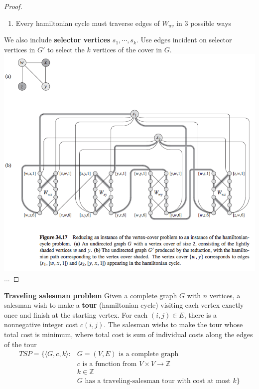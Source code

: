 \documentclass[11pt]{article}
\begin{document}
\begin{theorem*}
\begin{enumerate}
\begin{proof}
\begin{enumerate}
                \item Every hamiltonian cycle must traverse edges of $W_{uv}$ in 3 possible ways
            \end{enumerate}
            We also include \textbf{selector vertices} $s_1,\cdots, s_k$. Use edges incident on selector vertices in $G'$ to select the $k$ vertices of the cover in $G$. \\ 
            \includegraphics[width=\textwidth]{hamcycle_npc2.png}
            ...
        \end{proof}
    \end{enumerate}
\end{theorem*}


\begin{defn*}
    \textbf{Traveling salesman problem} Given a complete graph $G$ with $n$ vertices, a salesman wish to make a \textbf{tour} (hamiltonian cycle) visiting each vertex exactly once and finish at the starting vertex. For each $(i,j)\in E$, there is a nonnegative integer cost $c(i,j)$. The salesman wishs to make the tour whose total cost is minimum, where total cost is sum of individual costs along the edges of the tour 
    \begin{align*}
        TSP = \{\langle G, c, k \rangle : &G = (V,E) \text{ is a complete graph } \\
                    & \text{$c$ is a function from } V \times V \to \mathbb{Z}\\ 
                    & k\in \mathbb{Z} \\
                    & \text{$G$ has a traveling-salesman tour with cost at most } k \}\\
    \end{align*}
\end{defn*}
\end{document}
